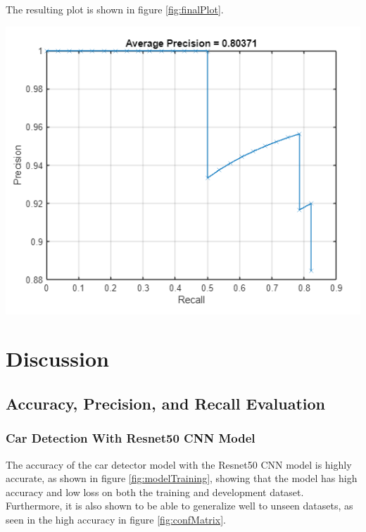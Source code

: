 \documentclass[man]{apa7}
\begin{document}
The resulting plot is shown in figure \ref{fig:finalPlot}.

\newpage

\begin{minipage}{\linewidth}
  \includegraphics[]{figures/finalPrecRecPlot.png}
  \label{fig:finalPlot}
\end{minipage}

\newpage

\section{Discussion}

\subsection{Accuracy, Precision, and Recall Evaluation}

\subsubsection{Car Detection With Resnet50 CNN Model}

The accuracy of the car detector model with the Resnet50 CNN model is highly accurate, as shown in figure \ref{fig:modelTraining}, showing that the model has high accuracy and low loss on both the training and development dataset. Furthermore, it is also shown to be able to generalize well to unseen datasets, as seen in the high accuracy in figure \ref{fig:confMatrix}.
\end{document}
